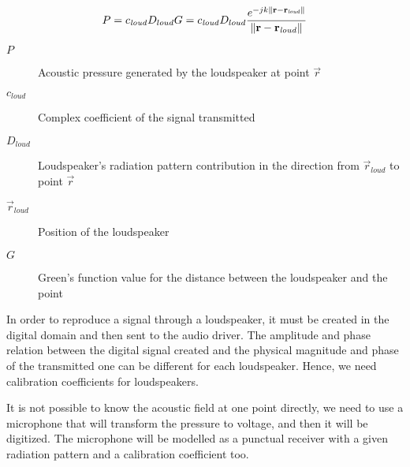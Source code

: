 \begin{equation}
P = c_\mathit{loud} D_{loud} G = c_\mathit{loud} D_{loud} \frac{e^{-j k \left\| \mathbf{r} - \mathbf{r}_\mathit{loud} \right\|}}{\left\| \mathbf{r} - \mathbf{r}_\mathit{loud} \right\|}
\end{equation}

\begin{description}
	\item[$P$] Acoustic pressure generated by the loudspeaker at point $\vec{r}$
	\item[$c_\mathit{loud}$] Complex coefficient of the signal transmitted %
	\item[$D_{loud}$] Loudspeaker's radiation pattern contribution in the direction from $\vec{r}_\mathit{loud}$ to point $\vec{r}$%
	\item[$\vec{r}_{\mathit{loud}}$] Position of the loudspeaker
	\item[$G$] Green's function value for the distance between the loudspeaker and the point %
\end{description}

In order to reproduce a signal through a loudspeaker, it must be created in the digital domain and then sent to the audio driver. The amplitude and phase relation between the digital signal created and the physical magnitude and phase of the transmitted one can be different for each loudspeaker. Hence, we need calibration coefficients for loudspeakers.

It is not possible to know the acoustic field at one point directly, we need to use a microphone that will transform the pressure to voltage, and then it will be digitized. The microphone will be modelled as a punctual receiver with a given radiation pattern and a calibration coefficient too.

